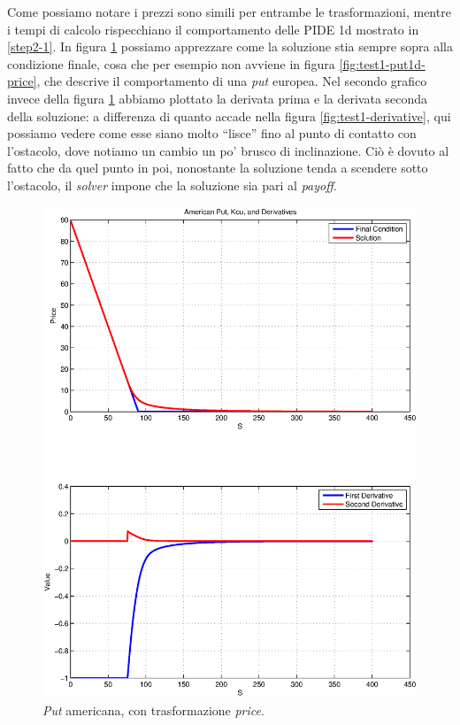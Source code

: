 \documentclass[a4paper,10pt]{report}
\theoremstyle{plain}
\theoremstyle{definition}
\theoremstyle{remark}
\begin{document}
Come possiamo notare i prezzi sono simili per entrambe le trasformazioni, mentre i tempi di calcolo rispecchiano il comportamento delle PIDE 1d mostrato in \ref{step2-1}. In figura \ref{fig:test2-putamkou} possiamo apprezzare come la soluzione stia sempre sopra alla condizione finale, cosa che per esempio non avviene in figura \ref{fig:test1-put1d-price}, che descrive il comportamento di una \emph{put} europea. Nel secondo grafico invece della figura \ref{fig:test2-putamkou} abbiamo plottato la derivata prima e la derivata seconda della soluzione: a differenza di quanto accade nella figura \ref{fig:test1-derivative}, qui possiamo vedere come esse siano molto ``lisce'' fino al punto di contatto con l'ostacolo, dove notiamo un cambio un po' brusco di inclinazione. Ci\`o \`e dovuto al fatto che da quel punto in poi, nonostante la soluzione tenda a scendere sotto l'ostacolo, il \emph{solver} impone che la soluzione sia pari al \emph{payoff}.
\begin{figure}[htp!]
\begin{center}
\includegraphics[width=\textwidth]{img/test2-putamkou.eps}
\caption{\emph{Put} americana, con trasformazione \emph{price}.}
\label{fig:test2-putamkou}
\end{center}
\end{figure}
\newpage
\end{document}
